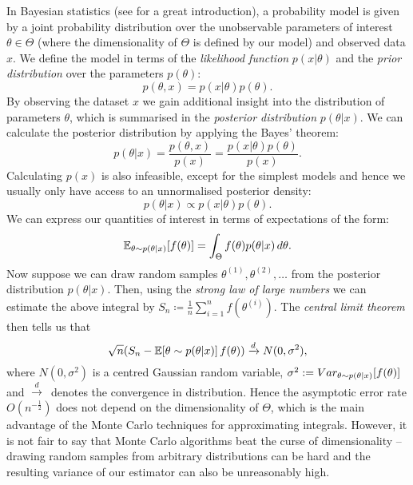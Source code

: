\documentclass[report.tex]{subfiles}
\begin{document}
In Bayesian statistics (see \citet{gelman2014bayesian} for a great introduction),
a probability model is given by a joint
probability distribution over the unobservable parameters of interest
$\theta \in \Theta$
(where the dimensionality of $\Theta$ is defined by our model)
and observed data $x$.
We define the model in terms of the \textit{likelihood function}
$p(x \vert \theta)$ and the \textit{prior distribution} over the parameters $p(\theta)$:
\begin{equation*}
  p(\theta, x) = p(x \vert \theta)p(\theta).
\end{equation*}
By observing the dataset $x$ we gain additional insight into the distribution of
parameters $\theta$, which is summarised in the \textit{posterior distribution}
$p(\theta \vert x)$.
We can calculate the posterior distribution by applying the Bayes' theorem:
\begin{equation*}
  p(\theta \vert x)
  = \frac{p(\theta, x)}{p(x)}
  = \frac{p(x \vert \theta)p(\theta)}{p(x)}.
\end{equation*}
Calculating $p(x)$ is also infeasible, except for the simplest models and hence
we usually only have access to an unnormalised posterior density:
\begin{equation*}
  p(\theta \vert x) \propto p(x \vert \theta)p(\theta).
\end{equation*}
We can express our quantities of interest in terms of expectations of the form:
\begin{equation*}
  \mathbb{E}_{{\theta \sim p(\theta \vert x)}}\!\left[{f(\theta)}\right]
  = \int_{{\Theta}}^{{}} {f(\theta)p(\theta \vert x)}\, d{\theta}.
\end{equation*}
Now suppose we can draw random samples $\theta^{(1)}, \theta^{(2)}, \dots$
from the posterior distribution $p(\theta \vert x)$.
Then, using the \textit{strong law of large numbers} we can estimate
the above integral by $S_{n} \coloneqq \frac{1}{n} \sum_{i = 1}^{n} f(\theta^{(i)})$.
The \textit{central limit theorem} then tells us that
\begin{equation*}
  \sqrt{n}(S_{n} - \mathbb{E}\!\left[{\theta \sim p(\theta \vert x)}\right]{f(\theta)})
  \xrightarrow[]{d} N(0, \sigma^{2}),
\end{equation*}
where $N(0, \sigma^2)$ is a centred Gaussian random variable,
$\sigma^2 := Var_{{\theta \sim p(\theta \vert x)}}\!\left[{f(\theta)}\right]$
and $\xrightarrow{d}$~denotes the convergence in distribution.
Hence the asymptotic error rate $O(n^{-\frac{1}{2}})$ does not depend
on the dimensionality of $\Theta$, which is the main advantage of the Monte Carlo
techniques for approximating integrals.
However, it is not fair to say that
Monte Carlo algorithms beat the curse of dimensionality --
drawing random samples from arbitrary distributions can be hard and the
resulting variance of our estimator can also be unreasonably high.
\end{document}
